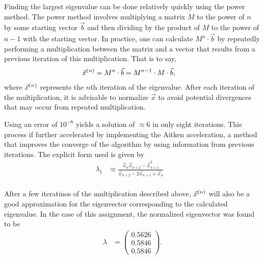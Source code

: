 \documentclass[12pt]{article}
\DeclarePairedDelimiter\rb{(}{)}
\begin{document}
Finding the largest eigenvalue can be done relatively quickly using the power method. The power method involves multiplying a matrix \(M\) to the power of \(n\) by some starting vector \(\vec{b}\) and then dividing by the product of \(M\) to the power of \(n-1\) with the starting vector. In practice, one can calculate \(M^{n} \cdot \vec{b}\) by repeatedly performing a multiplication between the matrix and a vector that results from a previous iteration of this multiplication. That is to say,
\begin{align*}
	\vec{x}^{\rb*{n}} & =  M^{n} \cdot \vec{b}  =  M^{n-1} \cdot M \cdot \vec{b}, &\\
\end{align*}
where \(\vec{x}^{\rb*{n}}\) represents the \(n\)th iteration of the eigenvalue. After each iteration of the multiplication, it is advisable to normalize \(\vec{x}\) to avoid potential divergences that may occur from repeated multiplication. 

Using an error of \(10^{-6}\) yields a solution of \(\approx 6\) in only eight iterations. This process if further accelerated by implementing the Aitken acceleration, a method that improves the converge of the algorithm by using information from previous iterations. The explicit form used is given by
\begin{align*}
	\lambda_{1} & \approx \frac{\vec{x}_{n} \vec{x}_{n+2} - \vec{x}_{n+1}^{2}}{\vec{x}_{n+2} - 2 \vec{x}_{n+1} + \vec{x}_{n}} &\\
\end{align*}

After a few iteratinos of the multiplication described above, \(\vec{x}^{\rb*{n}}\) will also be a good approximation for the eigenvector corresponding to the calculated eigenvalue. In the case of this assignment, the normalized eigenvector was found to be
\begin{align*}
	\lambda & =  \begin{pmatrix}
		0.5626\\
		0.5846\\
		0.5846
	\end{pmatrix}.
\end{align*}
\end{document}
